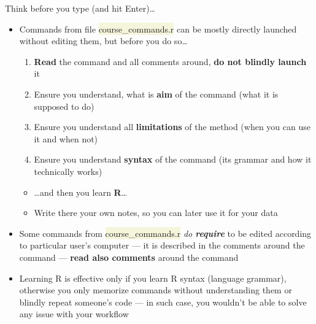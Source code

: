 \documentclass[compress, xelatex, 11pt, xcolor=svgnames, aspectratio=169, url={hyphens, lowtilde}]{beamer}
\renewcommand{\texttt}[1]{\colorbox{Beige}{{\ttfamily #1}}}
\begin{document}
\begin{frame}{Think before you type (and hit Enter)\ldots}
	\begin{itemize}
		\item Commands from file \texttt{course\_commands.r} can be mostly directly launched without editing them, but before you do so\ldots
		\begin{enumerate}
			\item \textbf{Read} the command and all comments around, \textbf{do not blindly launch} it
			\item Ensure you understand, what is \textbf{aim} of the command (what it is supposed to do)
			\item Ensure you understand all \textbf{limitations} of the method (when you can use it and when not)
			\item Ensure you understand \textbf{syntax} of the command (its grammar and how it technically works)
		\end{enumerate}
		\begin{itemize}
			\item \ldots and then you \alert{learn} \textbf{R}\ldots
			\item Write there your own notes, so you can later use it for your data
		\end{itemize}
		\item Some \alert{commands} from \texttt{course\_commands.r} \alert{\textit{do \textbf{require}} to be edited} according to particular user's computer --- it is described in the comments around the command --- \textbf{read also comments} around the command
		\item Learning R is effective only if you learn R syntax (language grammar), otherwise you only memorize commands without understanding them or blindly repeat someone's code --- in such case, you wouldn't be able to solve any issue with your workflow
	\end{itemize}
\end{frame}
\end{document}
